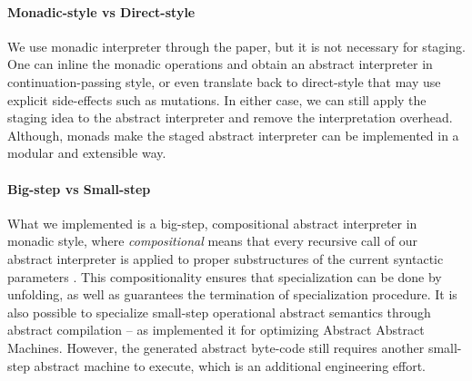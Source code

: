 \paragraph{Monadic-style vs Direct-style} We use monadic interpreter through the paper,
but it is not necessary for staging. One can inline the monadic
operations and obtain an abstract interpreter in continuation-passing
style, or even translate back to direct-style that may use explicit
side-effects such as mutations. In either case, we can still apply the
staging idea to the abstract interpreter and remove the interpretation
overhead. Although, monads make the staged abstract interpreter can be
implemented in a modular and extensible way.

\paragraph{Big-step vs Small-step}

What we implemented is a big-step, compositional abstract interpreter in monadic
style, where \textit{compositional} means that every recursive call of our abstract
interpreter is applied to proper substructures of the current syntactic
parameters \cite{10.1007/3-540-61580-6_11}. This compositionality ensures that
specialization can be done by unfolding, as well as guarantees the termination
of specialization procedure. It is also possible to specialize small-step
operational abstract semantics through abstract compilation
\cite{Boucher:1996:ACN:647473.727587} -- as
\citet{Johnson:2013:OAA:2500365.2500604} implemented it for
optimizing Abstract Abstract Machines. However, the generated abstract
byte-code still requires another small-step abstract machine to execute, which is
an additional engineering effort.

